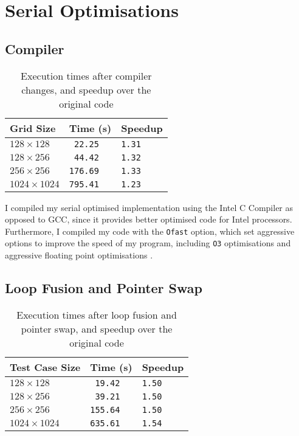\documentclass[11pt, twocolumn, a4paper]{article}
\begin{document}
\section{Serial Optimisations}

\subsection{Compiler}

\begin{table}[htbp]
  \begin{center}
  \caption{Execution times after compiler changes, and speedup over the original code}\label{tab:compiler_changes}
  \begin{tabular}{l | l l} 
      \hline\hline
      Grid Size&Time (s)&Speedup\\
      \hline
      $128 \times 128$&\texttt{ 22.25}&\texttt{1.31}\\
      $128 \times 256$&\texttt{ 44.42}&\texttt{1.32}\\
      $256 \times 256$&\texttt{176.69}&\texttt{1.33}\\
      $1024 \times 1024$&\texttt{795.41}&\texttt{1.23}\\
      \hline
    \end{tabular}
  \end{center}
\end{table} 

I compiled my serial optimised implementation using the Intel C Compiler as opposed to GCC, since it provides better optimised code for Intel processors.
Furthermore, I compiled my code with the \texttt{Ofast} option, which set aggressive options to improve the speed of my program, including \texttt{O3} optimisations and aggressive floating point optimisations \cite{icc}.

\subsection{Loop Fusion and Pointer Swap}

\begin{table}[htbp]
  \begin{center}
  \caption{Execution times after loop fusion and pointer swap, and speedup over the original code}\label{tab:loop_fusion_pointer_swap}
  \begin{tabular}{l | l l} 
      \hline\hline
      Test Case Size&Time (s)&Speedup\\
      \hline
      $128 \times 128$&\texttt{ 19.42}&\texttt{1.50}\\
      $128 \times 256$&\texttt{ 39.21}&\texttt{1.50}\\
      $256 \times 256$&\texttt{155.64}&\texttt{1.50}\\
      $1024 \times 1024$&\texttt{635.61}&\texttt{1.54}\\
      \hline
    \end{tabular}
  \end{center}
\end{table} 
\end{document}
